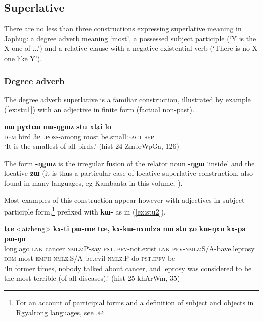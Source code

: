 \documentclass[oneside,a4paper,11pt]{article}
\newcommand{\ipa}[1]{{\phon\textbf{#1}}} %
\begin{document}
\subsection{Superlative}
There are no less than three constructions expressing superlative meaning in Japhug: a degree adverb meaning `most', a possessed subject participle (`Y is the X one of ...') and a relative clause with a negative existential verb (`There is no X one like Y').

 \subsubsection{Degree adverb}
 The degree adverb superlative is a familiar construction, illustrated by example (\ref{ex:stu1}) with an adjective in finite form (factual non-past).  
 
\begin{exe}
\ex \label{ex:stu1}
\gll 
\ipa{nɯ} 	\ipa{pɣɤtɕɯ} 	\ipa{nɯ-ŋgɯz} 	\ipa{stu} 	\ipa{xtɕi} 	\ipa{lo} \\
\textsc{dem} bird \textsc{3pl.poss-}among most be.small:\textsc{fact} \textsc{sfp} \\
\glt `It is the smallest of all birds.' (hist-24-ZmbrWpGa, 126)
\end{exe}

The form \ipa{-ŋgɯz} is the irregular fusion of the relator noun \ipa{-ŋgɯ} `inside' and the locative \ipa{zɯ} (it is thus a particular case of locative superlative construction, also found in many languages, eg Kambaata in this volume, \citealt{treis17comparison}). 

Most examples of this construction appear however with adjectives in subject participle form,\footnote{For an account of participial forms and a definition of subject and objects  in Rgyalrong languages, see \citet{jackson03caodeng, jackson14morpho, jacques16relatives}.} prefixed with \ipa{kɯ-} as in (\ref{ex:stu2}).

\begin{exe}
\ex \label{ex:stu2}
\gll \ipa{kɯɕɯŋgɯ} 	\ipa{tɕe} 	<aizheng> 	\ipa{kɤ-ti} 	\ipa{pɯ-me} 	\ipa{tɕe,} 	\ipa{kɤ-kɯ-nɤndza} 	\ipa{nɯ} 	\ipa{stu} 	\ipa{ʑo} 	\ipa{kɯ-ŋɤn} 	\ipa{kɤ-pa} 	\ipa{pɯ-ŋu} \\
long.ago \textsc{lnk} cancer \textsc{nmlz}:P-say \textsc{pst.ipfv}-not.exist \textsc{lnk} \textsc{pfv}-\textsc{nmlz}:S/A-have.leprosy \textsc{dem} most \textsc{emph} \textsc{nmlz}:S/A-be.evil \textsc{nmlz}:P-do \textsc{pst.ipfv}-be \\
\glt `In former times, nobody talked about cancer, and leprosy was considered to be the most terrible (of all diseases).' (hist-25-khArWm, 35)
\end{exe}
\end{document}

